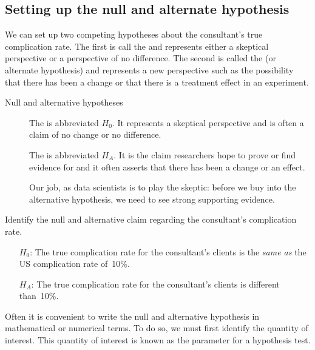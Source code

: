 \subsection{Setting up the null and alternate hypothesis}

We can set up two competing hypotheses about the consultant's true complication rate. The first is call the  and represents either a skeptical perspective or a perspective of no difference. The second is called the  (or alternate hypothesis) and represents a new perspective such as the possibility that there has been a change or that there is a treatment effect in an experiment.


\begin{onebox}{Null and alternative hypotheses}
\vspace{-5mm}
\begin{description}
\item[] The  is abbreviated $H_0$. It represents a skeptical perspective and is often a claim of no change or no difference.  
\item[] The  is abbreviated $H_A$. It is the claim researchers hope to prove or find evidence for and it often asserts that there has been a change or an effect.  

\item[] Our job, as data scientists is to play the skeptic: before we buy into the alternative hypothesis, we need to see strong supporting evidence.
\end{description}\end{onebox}

\begin{examplewrap}\begin{nexample}{Identify the null and alternative claim regarding the consultant's complication rate.}
\begin{itemize}
\item[$H_0$:] The true complication rate for the consultant's clients is the \emph{same as} the US complication rate of~10\%.
\item[$H_A$:] The true complication rate for the consultant's clients is different than~10\%.
\end{itemize}
\end{nexample}\end{examplewrap}

Often it is convenient to write the null and alternative hypothesis in mathematical or numerical terms. To do so, we must first identify the quantity of interest. This quantity of interest is known as the parameter for a hypothesis test.


